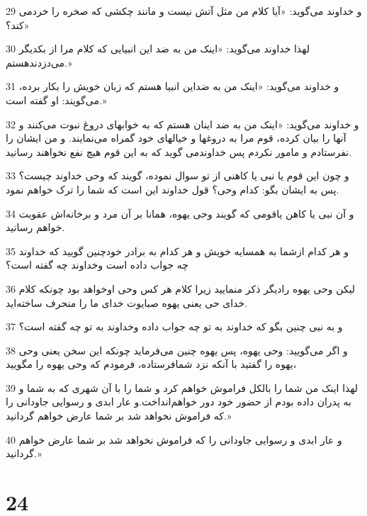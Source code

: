 \par 29 و خداوند می‌گوید: «آیا کلام من مثل آتش نیست و مانند چکشی که صخره را خردمی کند؟»
\par 30 لهذا خداوند می‌گوید: «اینک من به ضد این انبیایی که کلام مرا از بکدیگر می‌دزدندهستم.»
\par 31 و خداوند می‌گوید: «اینک من به ضداین انبیا هستم که زبان خویش را بکار برده، می‌گویند: او گفته است.»
\par 32 و خداوند می‌گوید: «اینک من به ضد اینان هستم که به خوابهای دروغ نبوت می‌کنند و آنها را بیان کرده، قوم مرا به دروغها و خیالهای خود گمراه می‌نمایند. و من ایشان را نفرستادم و مامور نکردم پس خداوندمی گوید که به این قوم هیچ نفع نخواهند رسانید. 
\par 33 و چون این قوم یا نبی یا کاهنی از تو سوال نموده، گویند که وحی خداوند چیست؟ پس به ایشان بگو: کدام وحی؟ قول خداوند این است که شما را ترک خواهم نمود.
\par 34 و آن نبی یا کاهن یاقومی که گویند وحی یهوه، همانا بر آن مرد و برخانه‌اش عقوبت خواهم رسانید.
\par 35 و هر کدام ازشما به همسایه خویش و هر کدام به برادر خودچنین گویید که خداوند چه جواب داده است وخداوند چه گفته است؟
\par 36 لیکن وحی یهوه رادیگر ذکر منمایید زیرا کلام هر کس وحی اوخواهد بود چونکه کلام خدای حی یعنی یهوه صبایوت خدای ما را منحرف ساخته‌اید.
\par 37 و به نبی چنین بگو که خداوند به تو چه جواب داده وخداوند به تو چه گفته است؟
\par 38 و اگر می‌گویید: وحی یهوه، پس یهوه چنین می‌فرماید چونکه این سخن یعنی وحی یهوه را گفتید با آنکه نزد شمافرستاده، فرمودم که وحی یهوه را مگویید،
\par 39 لهذا اینک من شما را بالکل فراموش خواهم کرد و شما را با آن شهری که به شما و به پدران داده بودم از حضور خود دور خواهم‌انداخت.و عار ابدی و رسوایی جاودانی را که فراموش نخواهد شد بر شما عارض خواهم گردانید.»
\par 40 و عار ابدی و رسوایی جاودانی را که فراموش نخواهد شد بر شما عارض خواهم گردانید.»
 
\chapter{24}

